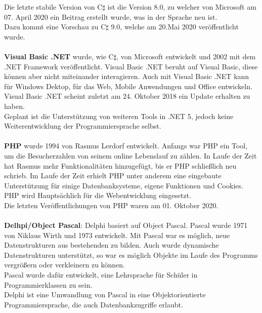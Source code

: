 \documentclass[ngerman]{article}
\begin{document}
    Die letzte stabile Version von C$\sharp$ ist die Version 8.0, zu welcher von Microsoft am 07. April 2020 ein Beitrag erstellt wurde, was in der Sprache neu ist. \cite{CSharpLatestRelease1}\\
    Dazu kommt eine Vorschau zu C$\sharp$ 9.0, welche am 20.Mai 2020 veröffentlicht wurde. \cite{CSharpLatestRelease2}\\\\
    \textbf{Visual Basic .NET} wurde, wie C$\sharp$, von Microsoft entwickelt und 2002 mit dem .NET Framework veröffentlicht. Visual Basic .NET beruht auf Visual Basic, diese können aber nicht miteinander interagieren. Auch mit Visual Basic .NET kann für Windows Dektop, für das Web, Mobile Anwendungen und Office entwickeln. \cite{VBNETHistory}\\
    Visual Basic .NET scheint zuletzt am 24. Oktober 2018 ein Update erhalten zu haben. \cite{VBNETLatestRelease1}\\
    Geplant ist die Unterstützung von weiteren Tools in .NET 5, jedoch keine Weiterentwicklung der Programmiersprache selbst. \cite{VBNETLatestRelease2}\\\\
    \textbf{PHP} wurde 1994 von Rasmus Lerdorf entwickelt. Anfangs war PHP ein Tool, um die Besucherzahlen von seinem online Lebenslauf zu zählen. In Laufe der Zeit hat Rasmus mehr Funktionalitäten hinzugefügt, bis er PHP schließlich neu schrieb. Im Laufe der Zeit erhielt PHP unter anderem eine eingebaute Unterstützung für einige Datenbanksysteme, eigene Funktionen und Cookies. PHP wird Hauptsächlich für die Webentwicklung eingesetzt. \cite{PHPHistory}\\
    Die letzten Veröffentlichungen von PHP waren am 01. Oktober 2020. \cite{PHPLatestRelease}\\\\
    \textbf{Delhpi/Object Pascal}: Delphi basiert auf Object Pascal. Pascal wurde 1971 von Niklaus Wirth und 1973 entwickelt. Mit Pascal war es möglich, neue Datenstrukturen aus bestehenden zu bilden. Auch wurde dynamische Datenstrukturen unterstützt, so war es möglich Objekte im Laufe des Programms vergrößern oder verkleinern zu können.\\
    Pascal wurde dafür entwickelt, eine Lehrsprache für Schüler in Programmierklassen zu sein.\\
    Delphi ist eine Umwandlung von Pascal in eine Objektorientierte Programmiersprache, die auch Datenbankzugriffe erlaubt. \cite{DelphiHistory}\\
\end{document}

